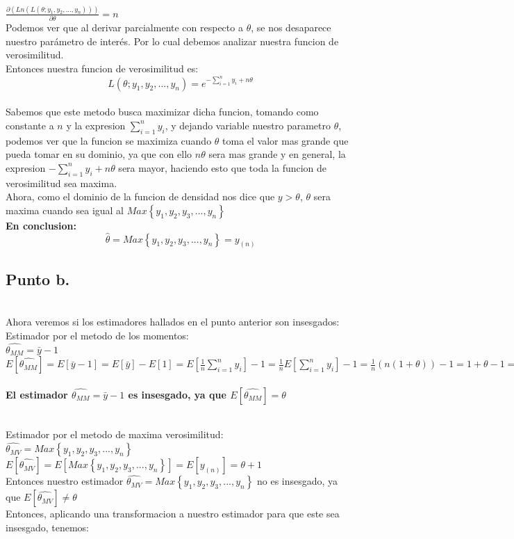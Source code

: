 \documentclass[letterpaper,12pt,onecolumn,titlepage]{article}
\begin{document}
~\\ $\frac{\partial(Ln(L(\theta;y_{1},y_{2},...,y_{n})))}{\partial\theta}= n$
~\\ Podemos ver que al derivar parcialmente con respecto a $\theta$, se nos desaparece nuestro par\'{a}metro de inter\'{e}s. Por lo cual debemos analizar nuestra funcion de verosimilitud. 
~\\ Entonces nuestra funcion de verosimilitud es: 
$$L(\theta; y_{1},y_{2},...,y_{n})=e^{-\sum \limits_{i=1}^n y_{i} + n\theta}$$
~\\ Sabemos que este metodo busca maximizar dicha funcion, tomando como constante a $n$ y la expresion $\sum \limits_{i=1}^n y_{i}$, y dejando variable nuestro parametro $\theta$, podemos ver que la funcion se maximiza cuando $\theta$ toma el valor mas grande que pueda tomar en su dominio, ya que con ello $n\theta$ sera mas grande y en general, la expresion $-\sum \limits_{i=1}^n y_{i} + n\theta$ sera mayor, haciendo esto que toda la funcion de verosimilitud sea maxima. 
~\\ Ahora, como el dominio de la funcion de densidad nos dice que $y>\theta$, $\theta$ sera maxima cuando sea igual al $Max\left\lbrace{y_{1},y_{2},y_{3},...,y_{n}}\right\rbrace$
~\\ \textbf{En conclusion:}
$$\hat{\theta}=Max\left\lbrace{y_{1},y_{2},y_{3},...,y_{n}}\right\rbrace=y_{(n)}$$

\subsection{Punto b.}
~\\ Ahora veremos si los estimadores hallados en el punto anterior son insesgados:
~\\ Estimador por el metodo de los momentos:
~\\ $\hat{\theta_{MM}}=\bar{y}-1$
~\\ $E[\hat{\theta_{MM}}]=E[\bar{y}-1]=E[\bar{y}]-E[1]=E[\frac{1}{n}\sum \limits_{i=1}^{n} y_{i}]-1=\frac{1}{n} E[\sum \limits_{i=1}^{n} y_{i}]-1=\frac{1}{n}(n(1+\theta))-1=1+\theta-1=\theta$
~\\ \textbf{El estimador $\hat{\theta_{MM}}=\bar{y}-1$ es insesgado, ya que  $E[\hat{\theta_{MM}}]=\theta$}

~\\ Estimador por el metodo de maxima verosimilitud:
~\\ $\hat{\theta_{MV}}=Max\left\lbrace{y_{1},y_{2},y_{3},...,y_{n}}\right\rbrace$
~\\ $E[\hat{\theta_{MV}}]=E[Max\left\lbrace{y_{1},y_{2},y_{3},...,y_{n}}\right\rbrace]=E[y_{(n)}]=\theta+1$
~\\ Entonces nuestro estimador  $\hat{\theta_{MV}}=Max\left\lbrace{y_{1},y_{2},y_{3},...,y_{n}}\right\rbrace$ no es insesgado, ya que $E[\hat{\theta_{MV}}]\neq \theta$
~\\ Entonces, aplicando una transformacion a nuestro estimador para que este sea insesgado, tenemos:
\end{document}
